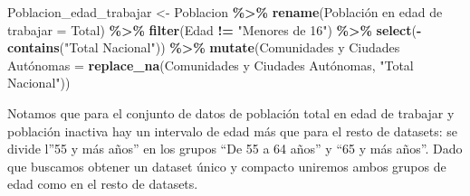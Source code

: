\documentclass[notspecified,article,submit,moreauthors,pdftex]{Definitions/mdpi}
\newenvironment{Shaded}{\begin{snugshade}}{\end{snugshade}}
\newcommand{\AttributeTok}[1]{\textcolor[rgb]{0.13,0.29,0.53}{#1}}
\newcommand{\FunctionTok}[1]{\textcolor[rgb]{0.13,0.29,0.53}{\textbf{#1}}}
\newcommand{\NormalTok}[1]{#1}
\newcommand{\OtherTok}[1]{\textcolor[rgb]{0.56,0.35,0.01}{#1}}
\newcommand{\SpecialCharTok}[1]{\textcolor[rgb]{0.81,0.36,0.00}{\textbf{#1}}}
\newcommand{\StringTok}[1]{\textcolor[rgb]{0.31,0.60,0.02}{#1}}
\begin{document}
\begin{Shaded}
\begin{Highlighting}[]
\NormalTok{Poblacion\_edad\_trabajar }\OtherTok{\textless{}{-}}\NormalTok{ Poblacion }\SpecialCharTok{\%\textgreater{}\%}
  \FunctionTok{rename}\NormalTok{(}\StringTok{\textasciigrave{}}\AttributeTok{Población en edad de trabajar}\StringTok{\textasciigrave{}} \OtherTok{=} \StringTok{\textasciigrave{}}\AttributeTok{Total}\StringTok{\textasciigrave{}}\NormalTok{) }\SpecialCharTok{\%\textgreater{}\%}
  \FunctionTok{filter}\NormalTok{(Edad }\SpecialCharTok{!=} \StringTok{"Menores de 16"}\NormalTok{) }\SpecialCharTok{\%\textgreater{}\%}
  \FunctionTok{select}\NormalTok{(}\SpecialCharTok{{-}}\FunctionTok{contains}\NormalTok{(}\StringTok{"Total Nacional"}\NormalTok{)) }\SpecialCharTok{\%\textgreater{}\%}
  \FunctionTok{mutate}\NormalTok{(}\StringTok{\textasciigrave{}}\AttributeTok{Comunidades y Ciudades Autónomas}\StringTok{\textasciigrave{}} \OtherTok{=} \FunctionTok{replace\_na}\NormalTok{(}\StringTok{\textasciigrave{}}\AttributeTok{Comunidades y Ciudades Autónomas}\StringTok{\textasciigrave{}}\NormalTok{, }\StringTok{"Total Nacional"}\NormalTok{))}
\end{Highlighting}
\end{Shaded}

Notamos que para el conjunto de datos de población total en edad de
trabajar y población inactiva hay un intervalo de edad más que para el
resto de datasets: se divide l''55 y más años'' en los grupos ``De 55 a
64 años'' y ``65 y más años''. Dado que buscamos obtener un dataset
único y compacto uniremos ambos grupos de edad como en el resto de
datasets.
\end{document}
